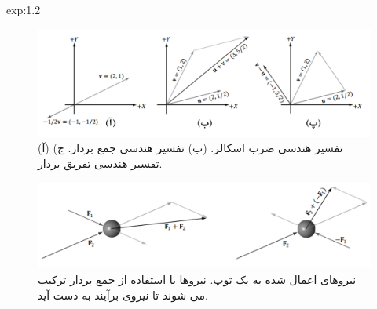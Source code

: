 {\begin{spacing}{1.5}
\begin{example}{exp:1.2}
            \begin{figure}[H]
                \centering
                \setlength{\belowcaptionskip}{-10pt}
                \includegraphics[width=\textwidth]{Images/4/4.Session.1.1.6}
                \caption{(آ) تفسیر هندسی ضرب اسکالر. (ب) تفسیر هندسی جمع بردار. ج) تفسیر هندسی تفریق بردار.}
                \label{fig:4.Session.1.1.6}
            \end{figure}

            \begin{figure}[H]
                \centering
                \setlength{\belowcaptionskip}{-10pt}
                \includegraphics[width=\textwidth]{Images/4/4.Session.1.1.7}
                \caption{نیروهای اعمال شده به یک توپ. نیروها با استفاده از جمع بردار ترکیب می شوند تا نیروی برآیند به دست آید. \textbf{\vspace{10pt}}}
                \label{fig:4.Session.1.1.7}
            \end{figure}
        \end{example}
    \end{spacing}
}


